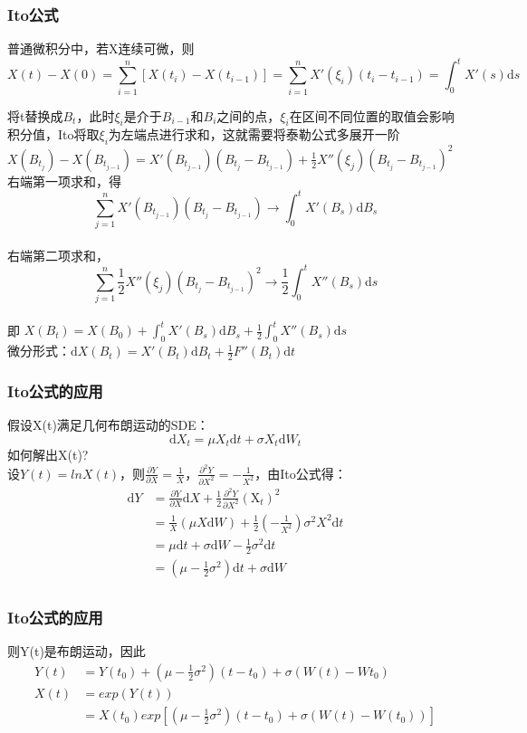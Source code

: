 \documentclass{beamer}
\begin{document}
\begin{frame}

\frametitle{Ito公式}
\footnotesize

普通微积分中，若X连续可微，则$$X(t)-X(0)=\sum_{i=1}^n[X(t_i)-X(t_{i-1})]=\sum_{i=1}^nX'({\xi}_i)(t_i-t_{i-1})=\int_0^t X'(s)\mathrm{d}s$$

将t替换成$B_t$，此时$\xi_i$是介于$B_{i-1}$和$B_i$之间的点，$\xi_i$在区间不同位置的取值会影响积分值，Ito将取${\xi_i}$为左端点进行求和，这就需要将泰勒公式多展开一阶
$X(B_{t_j})-X(B_{t_{j-1}}) = X'(B_{t_{j-1}})(B_{t_j}-B_{t_{j-1}})+\frac{1}{2}X''(\xi_j)(B_{t_j}-B_{t_{j-1}})^2$\\
右端第一项求和，得$$\sum_{j=1}^nX'(B_{t_{j-1}})(B_{t_j}-B_{t_{j-1}}) \rightarrow \int_0^tX'(B_s)\mathrm{d}B_s$$\\
右端第二项求和，$$\sum_{j=1}^n\frac{1}{2}X''(\xi_j)(B_{t_j}-B_{t_{j-1}})^2 \rightarrow \frac{1}{2}\int_0^tX''(B_s)\mathrm{d}s$$\\
即 $X(B_t) = X(B_0) + \int_0^tX'(B_s)\mathrm{d}B_s + \frac{1}{2}\int_0^tX''(B_s)\mathrm{d}s$\\
微分形式：$\mathrm{d}X(B_t) = X'(B_t)\mathrm{d}B_t + \frac{1}{2}F''(B_t)\mathrm{d}t$

\end{frame}

\begin{frame}
\frametitle{Ito公式的应用}
\footnotesize
假设X(t)满足几何布朗运动的SDE：$$\mathrm{d}X_t = \mu X_t\mathrm{d}t + \sigma X_t\mathrm{d}W_t$$
如何解出X(t)?\\
设$Y(t) = lnX(t)$，则$\frac{\partial Y}{\partial X} = \frac{1}{X}$，$\frac{\partial^2Y}{\partial X^2} = -\frac{1}{X^2}$，由Ito公式得：
\begin{align}
\mathrm{d}Y &= \frac{\partial Y}{\partial X}\mathrm{d}X + \frac{1}{2}\frac{\partial^2Y}{\partial X^2}(\mathrm X_t)^2\\
&= \frac{1}{X}(\mu X\mathrm{d}W) + \frac{1}{2}(-\frac{1}{X^2})\sigma^2X^2\mathrm{d}t\\
&= \mu \mathrm{d}t + \sigma \mathrm{d}W - \frac{1}{2}\sigma^2\mathrm{d}t\\
&= (\mu-\frac{1}{2}\sigma^2)\mathrm{d}t + \sigma\mathrm{d}W\\
\end{align}


\end{frame}

\begin{frame}
\frametitle{Ito公式的应用}
\footnotesize
则Y(t)是布朗运动，因此
\begin{align}
Y(t) &= Y(t_0)+(\mu-\frac{1}{2}\sigma^2)(t-t_0) + \sigma(W(t)-W{t_0})\\
X(t) &= exp(Y(t))\\
&= X(t_0)exp[(\mu-\frac{1}{2}\sigma^2)(t-t_0)+\sigma(W(t)-W(t_0))]
\end{align}

\end{frame}
\end{document}

